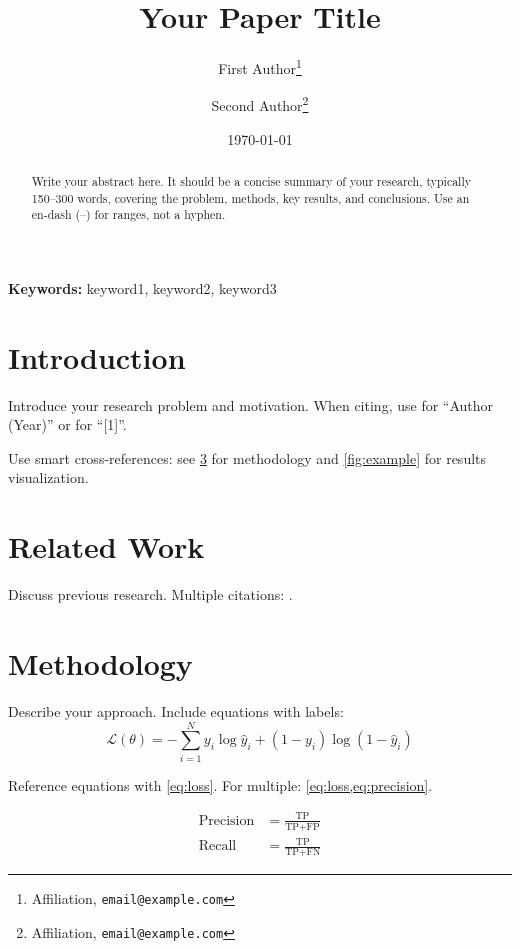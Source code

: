\documentclass[11pt,a4paper]{article}
\title{Your Paper Title}
\author{
    First Author\thanks{Affiliation, \texttt{email@example.com}}
    \and
    Second Author\thanks{Affiliation, \texttt{email@example.com}}
}
\date{\today}
\theoremstyle{definition}
\theoremstyle{remark}
\begin{document}
\maketitle

\begin{abstract}
Write your abstract here. It should be a concise summary of your research,
typically 150--300 words, covering the problem, methods, key results, and conclusions.
Use an en-dash (--) for ranges, not a hyphen.
\end{abstract}

\noindent\textbf{Keywords:} keyword1, keyword2, keyword3

\section{Introduction}
\label{sec:intro}

Introduce your research problem and motivation. When citing, use
\textcite{example_key} for ``Author (Year)'' or \cite{example_key} for ``[1]''.

Use smart cross-references: see \cref{sec:methods} for methodology and
\cref{fig:example} for results visualization.

\section{Related Work}
\label{sec:related}

Discuss previous research. Multiple citations: \cite{example_key,book_example}.

\section{Methodology}
\label{sec:methods}

Describe your approach. Include equations with labels:
\begin{equation}
    \mathcal{L}(\theta) = -\sum_{i=1}^{N} y_i \log \hat{y}_i + (1-y_i) \log(1-\hat{y}_i)
    \label{eq:loss}
\end{equation}

Reference equations with \cref{eq:loss}. For multiple: \cref{eq:loss,eq:precision}.

\begin{align}
    \text{Precision} &= \frac{\text{TP}}{\text{TP} + \text{FP}} \label{eq:precision} \\
    \text{Recall} &= \frac{\text{TP}}{\text{TP} + \text{FN}} \label{eq:recall}
\end{align}
\end{document}
